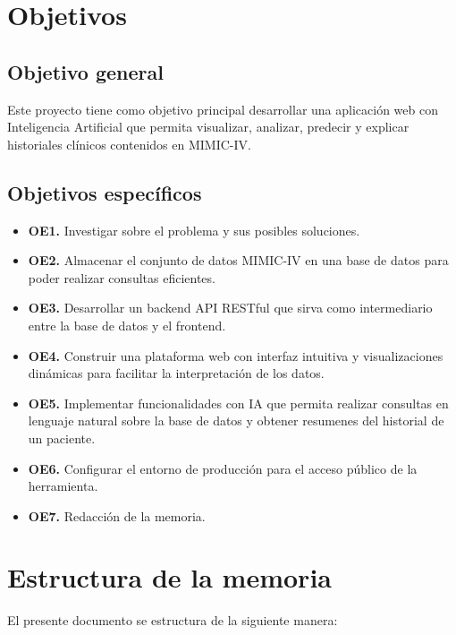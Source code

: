 \section{Objetivos}

\subsection{Objetivo general}

Este proyecto tiene como objetivo principal desarrollar una aplicación web con Inteligencia Artificial que permita visualizar, analizar, predecir y explicar historiales clínicos contenidos en MIMIC-IV.

\subsection{Objetivos específicos}

\begin{itemize}
\item \textbf{OE1.} Investigar sobre el problema y sus posibles soluciones.
\item \textbf{OE2.} Almacenar el conjunto de datos MIMIC-IV en una base de datos para poder realizar consultas eficientes.
\item \textbf{OE3.} Desarrollar un backend API RESTful que sirva como intermediario entre la base de datos y el frontend.
\item \textbf{OE4.} Construir una plataforma web con interfaz intuitiva y visualizaciones dinámicas para facilitar la interpretación de los datos.
\item \textbf{OE5.} Implementar funcionalidades con IA que permita realizar consultas en lenguaje natural sobre la base de datos y obtener resumenes del historial de un paciente.
\item \textbf{OE6.} Configurar el entorno de producción para el acceso público de la herramienta.
\item \textbf{OE7.} Redacción de la memoria.
\end{itemize}


\section{Estructura de la memoria}

El presente documento se estructura de la siguiente manera:

